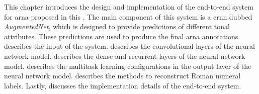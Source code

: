 

This chapter introduces the design and implementation of the
end-to-end system for \gls{arna} proposed in this
\thesisdiss{}. The main component of this system is a
\gls{crnn} dubbed \emph{AugmentedNet}, which is designed to
provide predictions of different tonal attributes. These
predictions are used to produce the final \gls{arna}
annotations.  describes the input of the
system. 
describes the convolutional layers of the neural network
model.  describes the dense
and recurrent layers of the neural network model.
 describes the
multitask learning configurations in the output layer of the
neural network model. 
describes the methods to reconstruct Roman numeral labels.
Lastly,  discusses the implementation
details of the end-to-end system.
